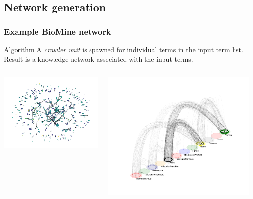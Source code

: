 \documentclass{beamer}
\begin{document}
  \subsection{Network generation}
  \begin{frame}\frametitle{Example BioMine network}
    \begin{block}{Algorithm}
      A \textit{crawler unit} is spawned for individual terms in the input term list. Result is a knowledge network associated with the input terms.
     \end{block}
     \begin{columns}
       \begin{column}{0.3\textwidth}
         \includegraphics[scale=0.25]{images/diabetes_mesh}
       \end{column}
       \begin{column}{0.7\textwidth}
         \includegraphics[scale=0.33]{images/SNPmpx}
         \end{column}

       \end{columns}
\end{frame}
\end{document}
